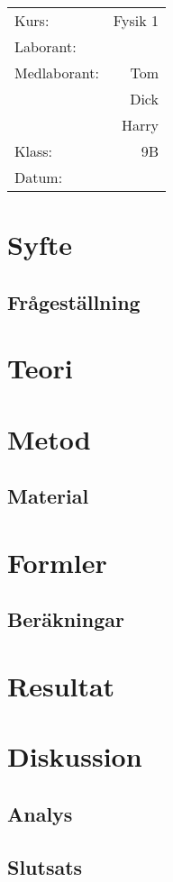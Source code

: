 \begin{titlepage}\makeatletter
	\vspace*{\fill}
	\centering
	{\huge \@title}
	\vspace*{\fill}

	\begin{flushright}
		\begin{tabular}{ lr }
			Kurs:        & Fysik 1  \\
			Laborant:    & \@author \\
			Medlaborant: & Tom      \\
			             & Dick     \\
			             & Harry    \\
			Klass:       & 9B       \\
			Datum:       & \@date   \\
		\end{tabular}
	\end{flushright}
\end{titlepage}\makeatother

\begin{abstract}
	\LaTeX
\end{abstract}

\newpage\tableofcontents\newpage

\section{Syfte}
\subsection{Frågeställning}
\section{Teori}
\section{Metod}
\subsection{Material}
\section{Formler}
\subsection{Beräkningar}
\section{Resultat}
\section{Diskussion}
\subsection{Analys}
\subsection{Slutsats}
